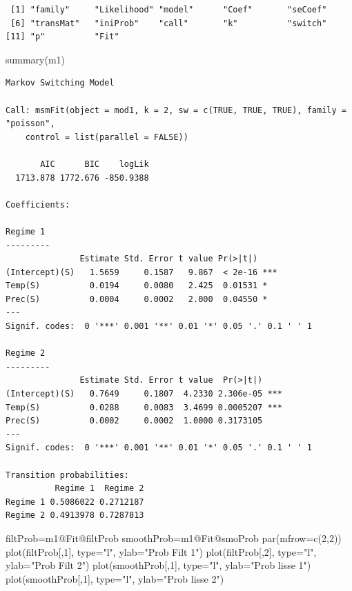 \documentclass[
  french,
]{article}
\newenvironment{Shaded}{\begin{snugshade}}{\end{snugshade}}
\newcommand{\AttributeTok}[1]{\textcolor[rgb]{0.77,0.63,0.00}{#1}}
\newcommand{\DecValTok}[1]{\textcolor[rgb]{0.00,0.00,0.81}{#1}}
\newcommand{\FunctionTok}[1]{\textcolor[rgb]{0.00,0.00,0.00}{#1}}
\newcommand{\NormalTok}[1]{#1}
\newcommand{\OtherTok}[1]{\textcolor[rgb]{0.56,0.35,0.01}{#1}}
\newcommand{\SpecialCharTok}[1]{\textcolor[rgb]{0.00,0.00,0.00}{#1}}
\newcommand{\StringTok}[1]{\textcolor[rgb]{0.31,0.60,0.02}{#1}}
\begin{document}
\begin{verbatim}
 [1] "family"     "Likelihood" "model"      "Coef"       "seCoef"    
 [6] "transMat"   "iniProb"    "call"       "k"          "switch"    
[11] "p"          "Fit"       
\end{verbatim}

\begin{Shaded}
\begin{Highlighting}[]
\FunctionTok{summary}\NormalTok{(m1)}
\end{Highlighting}
\end{Shaded}

\begin{verbatim}
Markov Switching Model

Call: msmFit(object = mod1, k = 2, sw = c(TRUE, TRUE, TRUE), family = "poisson", 
    control = list(parallel = FALSE))

       AIC      BIC    logLik
  1713.878 1772.676 -850.9388

Coefficients:

Regime 1 
---------
               Estimate Std. Error t value Pr(>|t|)    
(Intercept)(S)   1.5659     0.1587   9.867  < 2e-16 ***
Temp(S)          0.0194     0.0080   2.425  0.01531 *  
Prec(S)          0.0004     0.0002   2.000  0.04550 *  
---
Signif. codes:  0 '***' 0.001 '**' 0.01 '*' 0.05 '.' 0.1 ' ' 1

Regime 2 
---------
               Estimate Std. Error t value  Pr(>|t|)    
(Intercept)(S)   0.7649     0.1807  4.2330 2.306e-05 ***
Temp(S)          0.0288     0.0083  3.4699 0.0005207 ***
Prec(S)          0.0002     0.0002  1.0000 0.3173105    
---
Signif. codes:  0 '***' 0.001 '**' 0.01 '*' 0.05 '.' 0.1 ' ' 1

Transition probabilities:
          Regime 1  Regime 2
Regime 1 0.5086022 0.2712187
Regime 2 0.4913978 0.7287813
\end{verbatim}

\begin{Shaded}
\begin{Highlighting}[]
\NormalTok{filtProb}\OtherTok{=}\NormalTok{m1}\SpecialCharTok{@}\NormalTok{Fit}\SpecialCharTok{@}\NormalTok{filtProb}
\NormalTok{smoothProb}\OtherTok{=}\NormalTok{m1}\SpecialCharTok{@}\NormalTok{Fit}\SpecialCharTok{@}\NormalTok{smoProb}
\FunctionTok{par}\NormalTok{(}\AttributeTok{mfrow=}\FunctionTok{c}\NormalTok{(}\DecValTok{2}\NormalTok{,}\DecValTok{2}\NormalTok{))}
\FunctionTok{plot}\NormalTok{(filtProb[,}\DecValTok{1}\NormalTok{], }\AttributeTok{type=}\StringTok{"l"}\NormalTok{, }\AttributeTok{ylab=}\StringTok{"Prob Filt 1"}\NormalTok{)}
\FunctionTok{plot}\NormalTok{(filtProb[,}\DecValTok{2}\NormalTok{], }\AttributeTok{type=}\StringTok{"l"}\NormalTok{, }\AttributeTok{ylab=}\StringTok{"Prob Filt 2"}\NormalTok{)}
\FunctionTok{plot}\NormalTok{(smoothProb[,}\DecValTok{1}\NormalTok{], }\AttributeTok{type=}\StringTok{"l"}\NormalTok{, }\AttributeTok{ylab=}\StringTok{"Prob lisse 1"}\NormalTok{)}
\FunctionTok{plot}\NormalTok{(smoothProb[,}\DecValTok{1}\NormalTok{], }\AttributeTok{type=}\StringTok{"l"}\NormalTok{, }\AttributeTok{ylab=}\StringTok{"Prob lisse 2"}\NormalTok{)}
\end{Highlighting}
\end{Shaded}
\end{document}
